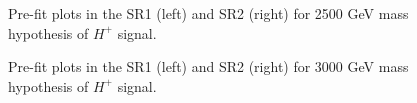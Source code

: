 \begin{figure}[H]
  \centering
  \caption{Pre-fit plots in the SR1 (left) and SR2 (right) for 2500 GeV mass hypothesis of $H^{+}$ signal.}
  \label{fig:Prefit_Hp2500_Asimov}
\end{figure}
\begin{figure}[H]
  \centering
  \caption{Pre-fit plots in the SR1 (left) and SR2 (right) for 3000 GeV mass hypothesis of $H^{+}$ signal.}
  \label{fig:Prefit_Hp3000_Asimov}
\end{figure}
